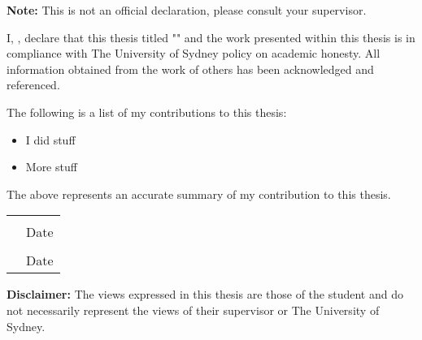 
\begin{declaration}

\textbf{Note:} This is not an official declaration, please consult your supervisor.

I, \theauthor, declare that this thesis titled "\thetitle" and the work presented within this thesis is in compliance with The University of Sydney policy on academic honesty. All information obtained from the work of others has been acknowledged and referenced.

The following is a list of my contributions to this thesis:
\begin{itemize}
	\item I did stuff
	\item More stuff
\end{itemize}
The above represents an accurate summary of my contribution to this thesis. 

\vspace{1em}
\begin{tabular}{@{}p{}p{}@{}}
	\hrulefill & \hrulefill \\
	\theauthor & Date \\
	\hrulefill & \hrulefill \\
	\thesupervisor & Date \\
\end{tabular}
\vspace{1em}

\textbf{Disclaimer:} The views expressed in this thesis are those of the student and do not necessarily represent the views of their supervisor or The University of Sydney.

\end{declaration}


